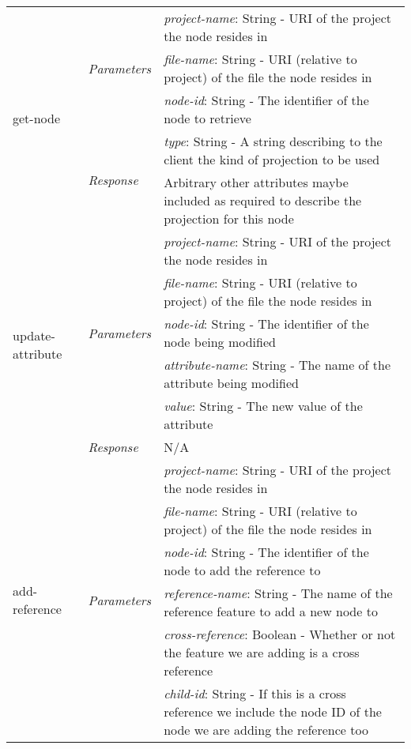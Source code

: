 \begin{table}[h!]
\begin{tabular}{| m{2.5cm}| m{2.3cm} | m{10.2cm} |}
\multirow{5}{*}{get-node} & \multirow{3}{*}{\emph{Parameters}} & \emph{project-name}: String - URI of the project the node resides in \\ \cline{3-3}
 & & \emph{file-name}: String -  URI (relative to project) of the file the node resides in \\ \cline{3-3}
 & & \emph{node-id}: String -  The identifier of the node to retrieve \\ \cline{2-3}
			& \multirow{2}{*}{\emph{Response}} & \emph{type}: String - A string describing to the client the kind of projection to be used \\ \cline{3-3}
 & & Arbitrary other attributes maybe included as required to describe the projection for this node\\ \cline{2-3}
			 \hline \hline	

\multirow{6}{*}{update-attribute} & \multirow{5}{*}{\emph{Parameters}} & \emph{project-name}: String - URI of the project the node resides in \\ \cline{3-3}
 & & \emph{file-name}: String -  URI (relative to project) of the file the node resides in \\ \cline{3-3}
 & & \emph{node-id}: String -  The identifier of the node being modified \\ \cline{3-3}
 & & \emph{attribute-name}: String - The name of the attribute being modified \\ \cline{3-3}
 & & \emph{value}: String - The new value of the attribute \\ \cline{2-3}
			& \multirow{1}{*}{\emph{Response}} & N/A \\
			 \hline \hline
			 
\multirow{8}{*}{add-reference} & 
 \multirow{7}{*}{\emph{Parameters}} 
   & \emph{project-name}: String - URI of the project the node resides in \\ \cline{3-3}
 & & \emph{file-name}: String -  URI (relative to project) of the file the node resides in \\ \cline{3-3}
 & & \emph{node-id}: String -  The identifier of the node to add the reference to \\ \cline{3-3}
 & & \emph{reference-name}: String - The name of the reference feature to add a new node to \\ \cline{3-3}
 & & \emph{cross-reference}: Boolean - Whether or not the feature we are adding is a cross reference  \\ \cline{3-3}
 & & \emph{child-id}: String - If this is a cross reference we include the node ID of the node we are adding the reference too \\ \cline{3-3}

			 
\end{tabular}
\end{table}

